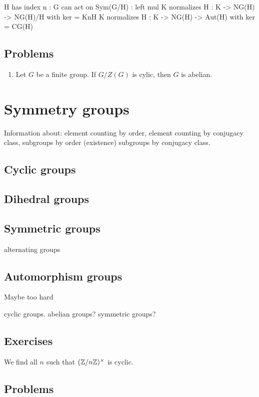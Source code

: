 \documentclass{../../large}
\begin{document}
H has index n  : G can act on Sym(G/H) : left mul
K normalizes H : K -> NG(H) -> NG(H)/H  with ker = KnH
K normalizes H : K -> NG(H) -> Aut(H)  with ker = CG(H)


\section*{Problems}
\begin{enumerate}
\item Let $G$ be a finite group. If $G/Z(G)$ is cylic, then $G$ is abelian.
\end{enumerate}

\chapter{Symmetry groups}

Information about:
element counting by order,
element counting by conjugacy class,
subgroups by order (existence)
subgroups by conjugacy class.



\section{Cyclic groups}
\section{Dihedral groups}
\section{Symmetric groups}
alternating groups

\section{Automorphism groups}
Maybe too hard

cyclic groups.
abelian groups?
symmetric groups?




\section*{Exercises}

\begin{prb}
We find all $n$ such that $(\mathbb{Z}/n\mathbb{Z})^\times$ is cyclic.
\end{prb}




\section*{Problems}
\end{document}
